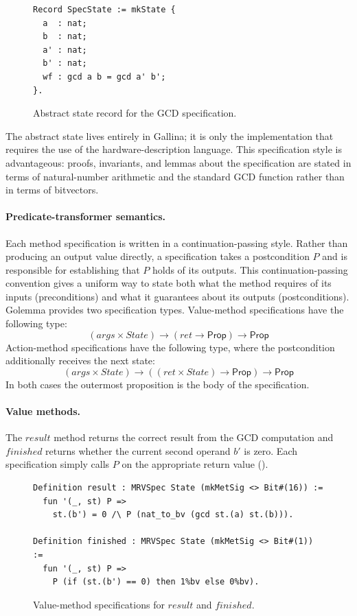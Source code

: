 \documentclass[fontset=fira-newtxsf]{mitthesis}
\theoremstyle{definition}
\theoremstyle{plain}
\begin{document}
\begin{figure}[H]
\begin{verbatim}
Record SpecState := mkState {
  a  : nat;
  b  : nat;
  a' : nat;
  b' : nat;
  wf : gcd a b = gcd a' b';
}.
\end{verbatim}
\caption[GCD abstract state]{Abstract state record for the GCD specification.}
\label{fig:gcd-spec-state}
\end{figure}

The abstract state lives entirely in Gallina; it is only the implementation that requires the use of the hardware-description language.
This specification style is advantageous: proofs, invariants, and lemmas about the specification are stated in terms of natural-number arithmetic and the standard GCD function rather than in terms of bitvectors.

\paragraph{Predicate-transformer semantics.}
Each method specification is written in a continuation-passing style.
Rather than producing an output value directly, a specification takes a postcondition $P$ and is responsible for establishing that $P$ holds of its outputs.
This continuation-passing convention gives a uniform way to state both what the method requires of its inputs (preconditions) and what it guarantees about its outputs (postconditions).
Golemma provides two specification types.
Value-method specifications have the following type:
\[
  (\mathit{args} \times \mathit{State}) \to (\mathit{ret} \to \mathsf{Prop}) \to \mathsf{Prop}
\]
Action-method specifications have the following type, where the postcondition additionally receives the next state:
\[
  (\mathit{args} \times \mathit{State}) \to ((\mathit{ret} \times \mathit{State}) \to \mathsf{Prop}) \to \mathsf{Prop}
\]
In both cases the outermost proposition is the body of the specification.

\paragraph{Value methods.}
The $\mathit{result}$ method returns the correct result from the GCD computation and $\mathit{finished}$ returns whether the current second operand $\mathit{b'}$ is zero.
Each specification simply calls $P$ on the appropriate return value ().

\begin{figure}[H]
\begin{verbatim}
Definition result : MRVSpec State (mkMetSig <> Bit#(16)) :=
  fun '(_, st) P =>
    st.(b') = 0 /\ P (nat_to_bv (gcd st.(a) st.(b))).

Definition finished : MRVSpec State (mkMetSig <> Bit#(1)) :=
  fun '(_, st) P =>
    P (if (st.(b') == 0) then 1%bv else 0%bv).
\end{verbatim}
\caption[GCD value-method specs]{Value-method specifications for $\mathit{result}$ and $\mathit{finished}$.}
\label{fig:gcd-val-specs}
\end{figure}
\end{document}
